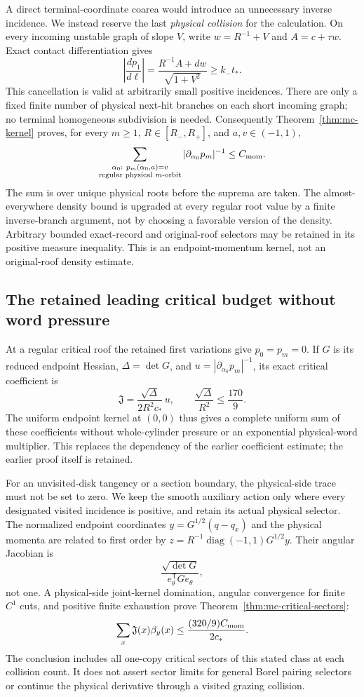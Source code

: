 \documentclass[11pt,reqno]{amsart}
\numberwithin{equation}{section}
\theoremstyle{definition}\newtheorem{definition}[theorem]{Definition}
\theoremstyle{remark}\newtheorem{remark}[theorem]{Remark}
\begin{document}
A direct terminal-coordinate coarea would introduce an unnecessary
inverse incidence. We instead reserve the last \emph{physical collision}
for the calculation. On every incoming unstable graph of slope $V$,
write $w=R^{-1}+V$ and $A=c+\tau w$. Exact contact differentiation gives
\[
 \left|\frac{dp_1}{d\ell}\right|
       =\frac{R^{-1}A+dw}{\sqrt{1+V^2}}
       \ge k_-t_*.
\]
This cancellation is valid at arbitrarily small positive incidences.
There are only a fixed finite number of physical next-hit branches on
each short incoming graph; no terminal homogeneous subdivision is needed.
Consequently Theorem~\ref{thm:mc-kernel} proves, for every $m\ge1$,
$R\in[R_-,R_+]$, and $a,v\in(-1,1)$,
\[
 \sum_{\substack{\alpha_0:\ p_m(\alpha_0,a)=v\\
                         \text{regular physical }m\text{-orbit}}}
       |\partial_{\alpha_0}p_m|^{-1}\le C_{\rm mom}.
\]
The sum is over unique physical roots before the suprema are taken.
The almost-everywhere density bound is upgraded at every regular root
value by a finite inverse-branch argument, not by choosing a favorable
version of the density. Arbitrary bounded exact-record and original-roof
selectors may be retained in its positive measure inequality. This is
an endpoint-momentum kernel, not an original-roof density estimate.

\subsection*{The retained leading critical budget without word pressure}
At a regular critical roof the retained first variations give
$p_0=p_m=0$. If $G$ is its reduced endpoint Hessian, $\Delta=\det G$,
and $u=|\partial_{\alpha_0}p_m|^{-1}$, its exact critical coefficient is
\[
 \mathfrak J=\frac{\sqrt\Delta}{2R^2c_*}\,u,
 \qquad \frac{\sqrt\Delta}{R^2}\le\frac{170}{9}.
\]
The uniform endpoint kernel at $(0,0)$ thus gives a complete uniform
sum of these coefficients without whole-cylinder pressure or an
exponential physical-word multiplier. This replaces the dependency of
the earlier coefficient estimate; the earlier proof itself is retained.

For an unvisited-disk tangency or a section boundary, the physical-side
trace must not be set to zero. We keep the smooth auxiliary action only
where every designated visited incidence is positive, and retain its
actual physical selector. The normalized endpoint coordinates
$y=G^{1/2}(q-q_x)$ and the physical momenta are related to first order by
$z=R^{-1}\operatorname{diag}(-1,1)G^{1/2}y$. Their angular Jacobian is
\[
 \frac{\sqrt{\det G}}{e_\theta^{\mathsf T}G e_\theta},
\]
not one. A physical-side joint-kernel domination, angular convergence for
finite $C^1$ cuts, and positive finite exhaustion prove
Theorem~\ref{thm:mc-critical-sectors}:
\[
 \sum_x\mathfrak J(x)\beta_y(x)
                    \le\frac{(320/9)C_{\rm mom}}{2c_*}.
\]
The conclusion includes all one-copy critical sectors of this stated
class at each collision count. It does not assert sector limits for
general Borel pairing selectors or continue the physical derivative
through a visited grazing collision.
\end{document}
